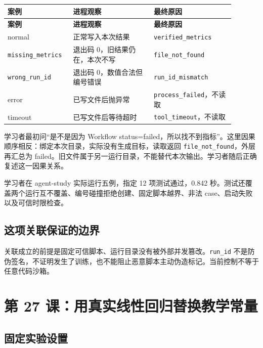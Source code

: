 \documentclass[UTF8,zihao=-4,fontset=fandol]{ctexart}
\begin{document}
{\small\setlength{\tabcolsep}{4pt}
\renewcommand{\arraystretch}{1.25}
\begin{longtable}{>{\raggedright\arraybackslash}p{0.23\linewidth}>{\raggedright\arraybackslash}p{0.33\linewidth}>{\raggedright\arraybackslash}p{0.33\linewidth}}
\toprule
\textbf{案例} & \textbf{进程观察} & \textbf{最终原因} \\
\midrule\endfirsthead
\toprule
\textbf{案例} & \textbf{进程观察} & \textbf{最终原因} \\
\midrule\endhead
\bottomrule\endfoot
normal & 正常写入本次结果 & \nolinkurl{verified_metrics} \\
\nolinkurl{missing_metrics} & 退出码 0，旧结果仍在，本次不写 & \nolinkurl{file_not_found} \\
\nolinkurl{wrong_run_id} & 退出码 0，数值合法但编号错误 & \nolinkurl{run_id_mismatch} \\
error & 已写文件后抛异常 & \nolinkurl{process_failed}，不读取 \\
timeout & 已写文件后等待超时 & \nolinkurl{tool_timeout}，不读取 \\
\end{longtable}}

学习者最初问“是不是因为 Workflow status=failed，所以找不到指标”。这里因果顺序相反：绑定本次目录，实际没有生成目标，读取返回 \nolinkurl{file_not_found}，外层再汇总为 failed。旧文件属于另一运行目录，不能替代本次输出。学习者随后正确复述这一因果关系。

学习者在 agent-study 实际运行五例，指定 12 项测试通过，0.842 秒。测试还覆盖两个运行互不覆盖、编号碰撞拒绝创建、固定脚本越界、非法 case、启动失败以及可信时限检查。

\subsection{这项关联保证的边界}

关联成立的前提是固定可信脚本、运行目录没有被外部并发篡改。\nolinkurl{run_id} 不是防伪签名，不证明发生了训练，也不能阻止恶意脚本主动伪造标记。当前控制不等于任意代码沙箱。

\section{第 27 课：用真实线性回归替换教学常量}

\subsection{固定实验设置}
\end{document}

